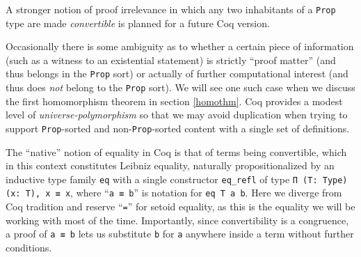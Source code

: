 \documentclass[a4paper,10pt,runningheads]{llncs}
\begin{document}
A stronger notion of proof irrelevance in which any two inhabitants of a \lstinline|Prop| type are made \emph{convertible} is planned for a future Coq version.

Occasionally there is some ambiguity as to whether a certain piece of information (such as a witness to an existential statement) is strictly ``proof matter'' (and thus belongs in the \lstinline|Prop| sort) or actually of further computational interest (and thus does \emph{not} belong to the \lstinline|Prop| sort). We will see one such case when we discuss the first homomorphism theorem in section \ref{homothm}. Coq provides a modest level of \emph{universe-polymorphism} so that we may avoid duplication when trying to support \lstinline|Prop|-sorted and non-\lstinline|Prop|-sorted content with a single set of definitions.



The ``native'' notion of equality in Coq is that of terms being convertible, which in this context constitutes Leibniz equality, naturally propositionalized by an inductive type family \lstinline|eq| with a single constructor \lstinline|eq_refl| of type \lstinline|Π (T: Type) (x: T), x ≡ x|, where ``\lstinline|a ≡ b|'' is notation for \lstinline|eq T a b|. Here we diverge from Coq tradition and reserve ``\lstinline|=|'' for setoid equality, as this is the equality we will be working with most of the time. Importantly, since convertibility is a congruence, a proof of \lstinline|a ≡ b| lets us substitute \lstinline|b| for \lstinline|a| anywhere inside a term without further conditions.
\end{document}

